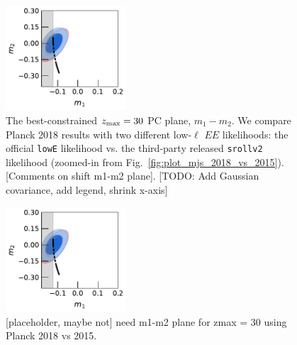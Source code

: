\documentclass[prd,twocolumn,amsmath,amssymb,floatfix,superscriptaddress,nofootinbib]{revtex4-1}
\begin{document}
\begin{figure}
\includegraphics[width=0.4\textwidth]{results/pc_results/plot_m1_m2_pl18_pc_zmax30_pliklite_srollv2_vs_pl18_pc_zmax30_pliklite_wTauTrajectory.pdf}
\caption{The best-constrained $z_{\rm max} = 30$ PC plane, $m_1-m_2$. We compare Planck 2018 results with two different low-$\ell$ $EE$ likelihoods: the official \texttt{lowE} likelihood vs. the third-party released \texttt{srollv2} likelihood (zoomed-in from Fig.~\ref{fig:plot_mjs_2018_vs_2015}). [Comments on shift m1-m2 plane]. [TODO: Add Gaussian covariance, add legend, shrink x-axis]
}
\label{fig:plot_m1m2}
\end{figure}

\begin{figure}
\includegraphics[width=0.4\textwidth]{results/pc_results/plot_m1_m2_pl18_pc_zmax30_pliklite_srollv2_vs_pl18_pc_zmax30_pliklite_wTauTrajectory.pdf}
\caption{[placeholder, maybe not] need m1-m2 plane for zmax = 30 using Planck 2018 vs 2015.
}
\label{fig:plot_m1m2}
\end{figure}
\end{document}
